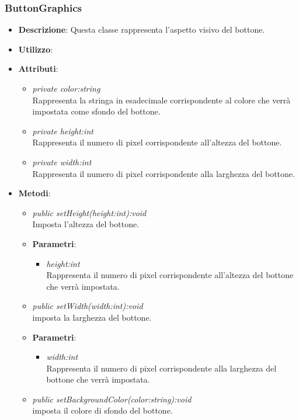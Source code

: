 \subsubsection{ButtonGraphics}
\begin{itemize}
\item \textbf{Descrizione}: Questa classe rappresenta l'aspetto visivo del bottone.
\item \textbf{Utilizzo}:
\item \textbf{Attributi}:
	\begin{itemize}
	\item \textit{private color:string}\\
	Rappresenta la stringa in esadecimale corrispondente al colore che verrà impostata come sfondo del bottone.
	\item \textit{private height:int}\\
	Rappresenta il numero di pixel corrispondente all'altezza del bottone. 
	\item \textit{private width:int}\\
	Rappresenta il numero di pixel corrispondente alla larghezza del bottone.
	\end{itemize}
\item \textbf{Metodi}:
	\begin{itemize}
	\item \textit{public setHeight(height:int):void}\\
	Imposta l'altezza del bottone.
		\item{\textbf{Parametri}: \begin{itemize}
		\item \textit{height:int}\\
		Rappresenta il numero di pixel corrispondente all'altezza del bottone che verrà impostata.
		\end{itemize}}
	\item \textit{public setWidth(width:int):void}\\
	imposta la larghezza del bottone.
		\item{\textbf{Parametri}: \begin{itemize}
		\item \textit{width:int}\\
		Rappresenta il numero di pixel corrispondente alla larghezza del bottone che verrà impostata.
		\end{itemize}}
	\item \textit{public setBackgroundColor(color:string):void}\\
	imposta il colore di sfondo del bottone.

\end{itemize}
\end{itemize}
